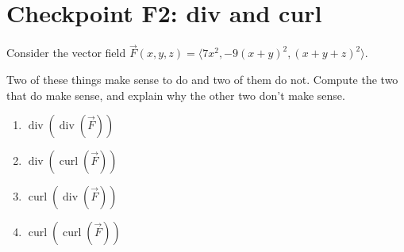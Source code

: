 


%


\allowdisplaybreaks
\section{Checkpoint F2: div and curl}

Consider the vector field \(\vec{F}(x,y,z) = \langle 7x^2, -9(x+y)^2, (x+y+z)^2 \rangle\).

Two of these things make sense to do and two of them do not. Compute the two that do make sense, and explain why the other two don't make sense.

\begin{enumerate}
    \item \(\operatorname{div}(\operatorname{div}(\vec{F}))\)
    \item \(\operatorname{div}(\operatorname{curl}(\vec{F}))\)
    \item \(\operatorname{curl}(\operatorname{div}(\vec{F}))\)
    \item \(\operatorname{curl}(\operatorname{curl}(\vec{F}))\)
\end{enumerate}



	
